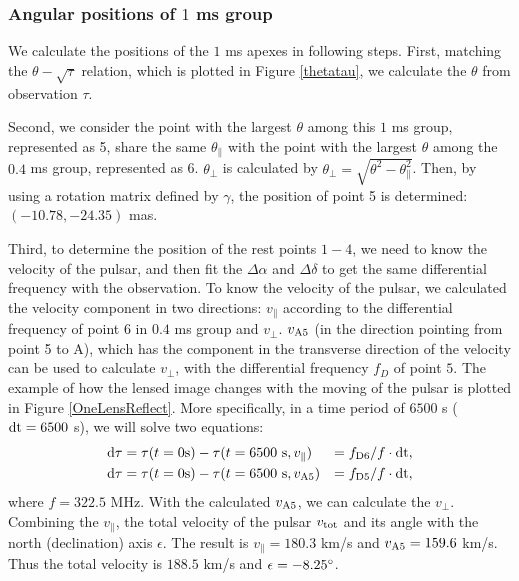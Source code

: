 \documentclass[useAMS,usenatbib]{mn2e}
\begin{document}
\subsubsection{Angular positions of $1$ ms group}
We calculate the positions of the $1$ ms apexes in following steps. First, matching the $\theta-\sqrt{\tau}$ relation, which is plotted in Figure \ref{thetatau}, we calculate the $\theta$ from observation $\tau$. 

Second, we consider the point with the largest $\theta$ among this $1$ ms group, represented as 5, share the same $\theta_{\parallel}$ with the point with the largest $\theta$ among the $0.4$ ms group, represented as 6. $\theta_{\bot}$ is calculated by $\theta_{\bot}=\sqrt{\theta^2-\theta_{\parallel} ^2} $. Then, by using a rotation matrix defined by $\gamma$, the position of point 5 is determined: $(-10.78,-24.35)$ mas. 

Third, to determine the position of the rest points $1-4$, we need to know the velocity of the pulsar, and then fit the $\Delta\alpha$ and $\Delta\delta$ to get the same differential frequency with the observation. To know the velocity of the pulsar, we calculated the velocity component in two directions: ${v_\parallel}$ according to the differential frequency of point $6$ in $0.4$ ms group and ${v_\bot}$.
$v_{\rm A5}$ (in the direction pointing from point 5 to A), which has the component in the transverse direction of the velocity can be used to calculate $v_{\bot}$, with the differential frequency $f_D$ of point $5$. The example of how the lensed image changes with the moving of the pulsar is plotted in Figure \ref{OneLensReflect}. More specifically, in a time period of $6500$ s ($\rm dt=6500$ s), we will solve two equations: 
\begin{align*}
{\rm d\tau}&=\tau(t=0{\rm s})-\tau(t=6500~{\rm s},v_{\parallel})&=f_{\rm D6}/f\cdot{\rm dt},\\
{\rm d\tau}&=\tau(t=0 {\rm s}) -\tau(t=6500~{\rm s}, v_{\rm A5}) & = f_{\rm D5} /f\cdot{\rm dt},
\end{align*}
where $f=322.5$ MHz. With the calculated $v_{\rm A5}$, we can calculate the $v_{\bot}$. Combining the $v_{\parallel}$, the total velocity of the pulsar $v_{\rm tot}$ and its angle with the north (declination) axis $\epsilon$. The result is $v_{\parallel}=180.3$ km/s and $v_{\rm A5}=159.6$ km/s. Thus the total velocity is $188.5$ km/s and $\epsilon=-8.25\degree$.
\end{document}
